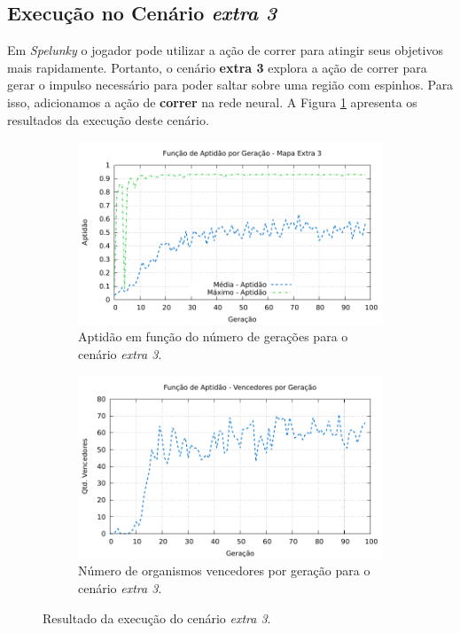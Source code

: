 \subsection{\label{section:experiment-extra3}Execução no Cenário \textit{extra
3}}

Em \textit{Spelunky} o jogador pode utilizar a ação de correr para atingir seus
objetivos mais rapidamente. Portanto, o cenário \textbf{extra 3} explora a ação
de correr para gerar o impulso necessário para poder saltar sobre uma região com
espinhos. Para isso, adicionamos a ação de \textbf{correr} na rede neural.  A
Figura \ref{fig:extra3-results} apresenta os resultados da execução deste
cenário.

\begin{figure}[H]
\centering
	\begin{subfigure}[b]{0.45\textwidth}
        \includegraphics[width=\textwidth]{fig/extra3-fitness.pdf}
        \caption{Aptidão em função do número de gerações para o cenário
        \textit{extra 3}.}
	\end{subfigure}
	\begin{subfigure}[b]{0.45\textwidth}
        \includegraphics[width=\textwidth]{fig/extra3-winners.pdf}
        \caption{Número de organismos vencedores por geração para o cenário
        \textit{extra 3}.}
	\end{subfigure}

    \caption{Resultado da execução do cenário \textit{extra 3}.}
	\label{fig:extra3-results}
\end{figure}

